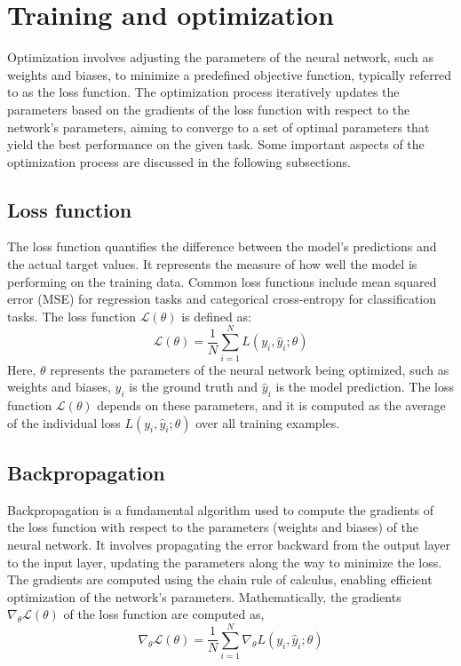 \section{Training and optimization} \label{optrain}
Optimization involves adjusting the parameters of the neural network, such as weights and biases, to minimize a predefined objective function, typically referred to as the loss function. The optimization process iteratively updates the parameters based on the gradients of the loss function with respect to the network's parameters, aiming to converge to a set of optimal parameters that yield the best performance on the given task. Some important aspects of the optimization process are discussed in the following subsections. 
\subsection{Loss function}
The loss function quantifies the difference between the model's predictions and the actual target values. It represents the measure of how well the model is performing on the training data. Common loss functions include mean squared error (MSE) for regression tasks and categorical cross-entropy for classification tasks. The loss function $\mathcal{L}(\theta)$ is defined as: 
\begin{equation}
    \mathcal{L}(\theta)=\frac{1}{N} \sum_{i=1}^N L\left(y_i, \hat{y}_i ; \theta\right)
    \end{equation}
Here, $\theta$ represents the parameters of the neural network being optimized, such as weights and biases, $y_i$ is the ground truth and $\hat{y}_i $ is the model prediction. The loss function $\mathcal{L}(\theta)$ depends on these parameters, and it is computed as the average of the individual loss $L\left(y_i, \hat{y}_i ; \theta\right)$ over all training examples.
\subsection{Backpropagation}
Backpropagation is a fundamental algorithm used to compute the gradients of the loss function with respect to the parameters (weights and biases) of the neural network. It involves propagating the error backward from the output layer to the input layer, updating the parameters along the way to minimize the loss. The gradients are computed using the chain rule of calculus, enabling efficient optimization of the network's parameters. Mathematically, the gradients $\nabla_\theta \mathcal{L}(\theta)$ of the loss function are computed as,
\begin{equation}
    \nabla_\theta \mathcal{L}(\theta)=\frac{1}{N} \sum_{i=1}^N \nabla_\theta L\left(y_i, \hat{y}_i ; \theta\right)
    \end{equation}

